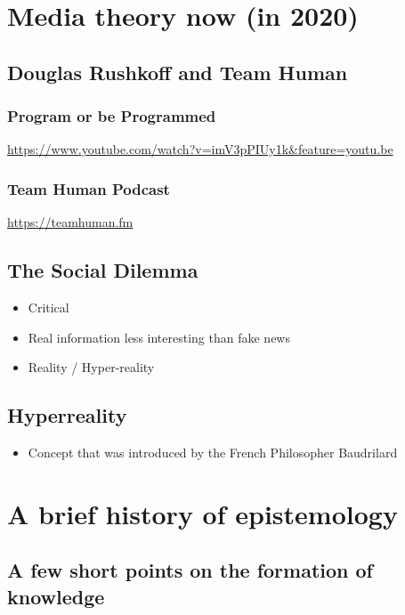 \documentclass[11pt]{article}
\begin{document}
\section*{Media theory now (in 2020)}
\label{sec:org61d22ec}

\subsection*{Douglas Rushkoff and Team Human}
\label{sec:orgcdb139d}
\subsubsection*{Program or be Programmed}
\label{sec:org942f11b}
\url{https://www.youtube.com/watch?v=imV3pPIUy1k\&feature=youtu.be}

\subsubsection*{Team Human Podcast}
\label{sec:org17cb91e}
\url{https://teamhuman.fm}

\subsection*{The Social Dilemma}
\label{sec:org3aae340}
\begin{itemize}
\item Critical
\item Real information less interesting than fake news
\item Reality / Hyper-reality
\end{itemize}

\subsection*{Hyperreality}
\label{sec:org14ec055}
\begin{itemize}
\item Concept that was introduced by the French Philosopher Baudrilard
\end{itemize}

\section*{A brief history of epistemology}
\label{sec:orgdd546f7}
\subsection*{A few short points on the formation of knowledge}
\label{sec:org1c0b532}
\end{document}
